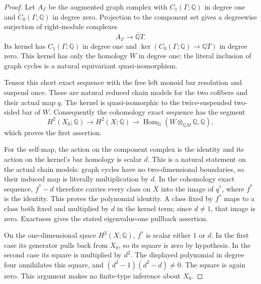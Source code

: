 \begin{proof}
Let $A_\Gamma$ be the augmented graph complex with
$C_1(\Gamma;\mathbb Q)$ in degree one and
$\widetilde C_0(\Gamma;\mathbb Q)$ in degree zero.
Projection to the component set gives a degreewise surjection
of right-module complexes
\[
 A_\Gamma\longrightarrow\widetilde{\mathbb QT}.
\]
Its kernel has $C_1(\Gamma;\mathbb Q)$ in degree one and
$\ker(C_0(\Gamma;\mathbb Q)\to\mathbb QT)$ in degree zero.
This kernel has only the homology $W$ in degree one; the literal
inclusion of graph cycles is a natural equivariant quasi-isomorphism.

Tensor this short exact sequence with the free left monoid bar
resolution and suspend once. These are natural reduced chain models
for the two cofibers and their actual map $q$. The kernel is
quasi-isomorphic to the twice-suspended two-sided bar of $W$.
Consequently the cohomology exact sequence has the segment
\[
 H^2(X_0;\mathbb Q)\longrightarrow H^2(X;\mathbb Q)
 \longrightarrow
 \operatorname{Hom}_{\mathbb Q}
       (W\otimes_{\mathbb QM}\mathbb Q,\mathbb Q),
\]
which proves the first assertion.

For the self-map, the action on the component complex is the
identity and its action on the kernel's bar homology is scalar $d$.
This is a natural statement on the actual chain models: graph
cycles have no two-dimensional boundaries, so their induced map
is literally multiplication by $d$. In the cohomology exact
sequence, $f^*-d$ therefore carries every class on $X$ into the
image of $q^*$, where $f^*$ is the identity. This proves the
polynomial identity. A class fixed by $f^*$ maps to a class both
fixed and multiplied by $d$ in the kernel term; since $d\ne1$,
that image is zero. Exactness gives the stated eigenvalue-one
pullback assertion.

On the one-dimensional space $H^2(X;\mathbb Q)$, $f^*$ is scalar
either $1$ or $d$. In the first case its generator pulls back from
$X_0$, so its square is zero by hypothesis. In the second case its
square is multiplied by $d^2$. The displayed polynomial in degree
four annihilates this square, and
$(d^2-1)(d^2-d)\ne0$. The square is again zero.
This argument makes no finite-type inference about $X_0$.
\end{proof}

